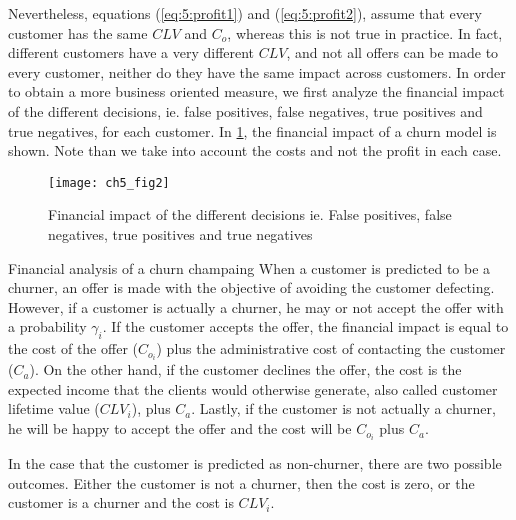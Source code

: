 Nevertheless, equations (\ref{eq:5:profit1}) and (\ref{eq:5:profit2}), assume that every customer 
has the same $CLV$ and $C_o$, whereas this is not true in practice. In fact, different customers 
have a very different $CLV$, and not all offers can be made to every customer, neither do they have 
the same impact across customers. In order to obtain a more business oriented measure, we first 
analyze the financial impact of the different decisions, ie. false positives, false negatives, true 
positives and true negatives, for each customer.	In \figurename{ \ref{fig:ch5:2}}, the financial 
impact of a churn model is shown. Note than we take into account the costs and not the profit in 
each case.

\begin{figure}[htbp]
  \centering
  \texttt{[image: ch5\_fig2]}
  \caption{Financial impact of the different decisions ie. False positives, false negatives, 
  true 	positives and true negatives}
	\label{fig:ch5:2}
\end{figure}

\newpage 
\begin{remark}{Financial analysis of a churn champaing}
When a customer is predicted to be a churner, an offer is made with the objective of avoiding 
the customer defecting. However, if a customer is actually a churner, he may or not accept the 
offer with a probability $\gamma_i$. If the customer accepts the offer, the financial impact is 
equal to the cost of the offer ($C_{o_i}$) plus the administrative cost of contacting the 
customer ($C_a$). On the other hand, if the customer declines the offer, the cost is the 
expected 	income that the clients would otherwise generate, also called customer lifetime value 
($CLV_i$), 	plus $C_a$. Lastly, if the customer is not actually a churner, he will be happy to 
accept the 	offer and the cost will be $C_{o_i}$ plus $C_a$.
	
In the case that the customer is predicted as non-churner, there are two possible outcomes. 
Either the customer is not a churner, then the cost is zero, or the customer is a churner and the 
cost is $CLV_i$. 
\end{remark}

